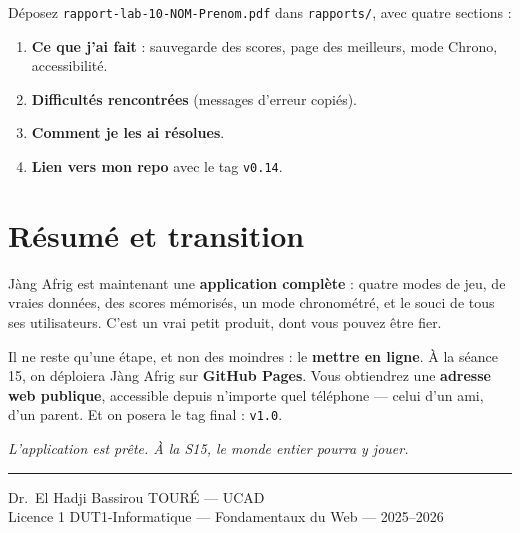 \documentclass[11pt,a4paper]{article}
\newcommand{\code}[1]{\texttt{#1}}
\begin{document}
\begin{attentionbox}
Déposez \code{rapport-lab-10-NOM-Prenom.pdf} dans \code{rapports/}, avec quatre sections :
\begin{enumerate}[leftmargin=*,noitemsep]
  \item \textbf{Ce que j'ai fait} : sauvegarde des scores, page des meilleurs, mode Chrono, accessibilité.
  \item \textbf{Difficultés rencontrées} (messages d'erreur copiés).
  \item \textbf{Comment je les ai résolues}.
  \item \textbf{Lien vers mon repo} avec le tag \code{v0.14}.
\end{enumerate}
\end{attentionbox}

\section{Résumé et transition}

Jàng Afrig est maintenant une \textbf{application complète} : quatre modes de jeu, de vraies données, des scores mémorisés, un mode chronométré, et le souci de tous ses utilisateurs. C'est un vrai petit produit, dont vous pouvez être fier.

Il ne reste qu'une étape, et non des moindres : le \textbf{mettre en ligne}. À la séance 15, on déploiera Jàng Afrig sur \textbf{GitHub Pages}. Vous obtiendrez une \textbf{adresse web publique}, accessible depuis n'importe quel téléphone --- celui d'un ami, d'un parent. Et on posera le tag final : \code{v1.0}.

\begin{center}
\textit{L'application est prête. À la S15, le monde entier pourra y jouer.}
\end{center}

\bigskip
\noindent\rule{\textwidth}{0.4pt}
\begin{center}
\small Dr.~El Hadji Bassirou TOURÉ --- UCAD\\
\small Licence 1 DUT1-Informatique --- Fondamentaux du Web --- 2025--2026
\end{center}
\end{document}
